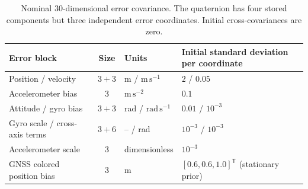 \begin{table}[!htbp]
\centering\small
\begin{tabularx}{\linewidth}{@{}lclX@{}}
\toprule
Error block & Size & Units & Initial standard deviation per coordinate \\
\midrule
Position / velocity & $3+3$ & m / $\mathrm{m\,s^{-1}}$ & $2$ / $0.05$ \\
Accelerometer bias & 3 & $\mathrm{m\,s^{-2}}$ & $0.1$ \\
Attitude / gyro bias & $3+3$ & rad / $\mathrm{rad\,s^{-1}}$ & $0.01$ / $10^{-3}$ \\
Gyro scale / cross-axis terms & $3+6$ & -- / rad & $10^{-3}$ / $10^{-3}$ \\
Accelerometer scale & 3 & dimensionless & $10^{-3}$ \\
GNSS colored position bias & 3 & m & $[0.6,0.6,1.0]^{\mathsf T}$ (stationary prior) \\
\bottomrule
\end{tabularx}
\caption{Nominal 30-dimensional error covariance. The quaternion has four stored components but three independent error coordinates. Initial cross-covariances are zero.}
\label{tab:nav-state}
\end{table}


